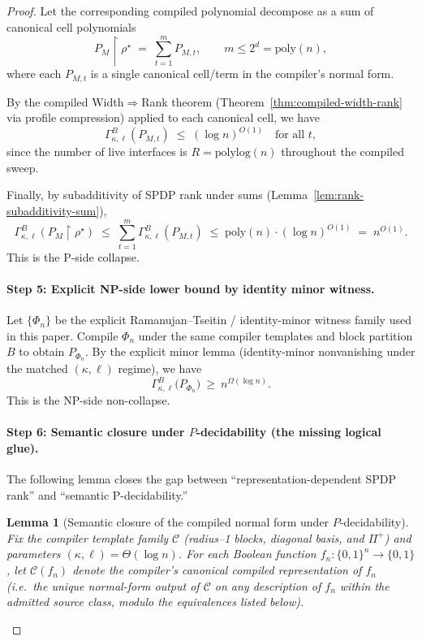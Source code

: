 \documentclass[12pt]{article}
\newcommand{\Comp}{\mathcal{C}}
\newtheorem{lemma}[theorem]{Lemma}
\theoremstyle{definition}
\theoremstyle{definition}
\theoremstyle{remark}
\theoremstyle{remark}
\begin{document}
\begin{proof}
Let the corresponding compiled polynomial decompose as a sum of canonical cell polynomials
\[
P_M\!\upharpoonright \rho^\star \;=\; \sum_{t=1}^{m} P_{M,t},
\qquad m \le 2^d = \mathrm{poly}(n),
\]
where each $P_{M,t}$ is a single canonical cell/term in the compiler's normal form.

By the compiled Width$\Rightarrow$Rank theorem (Theorem~\ref{thm:compiled-width-rank}
via profile compression) applied to each canonical cell, we have
\[
\Gamma^{B}_{\kappa,\ell}(P_{M,t}) \;\le\; (\log n)^{O(1)}
\quad\text{for all }t,
\]
since the number of live interfaces is $R=\mathrm{polylog}(n)$ throughout the compiled sweep.

Finally, by subadditivity of SPDP rank under sums (Lemma~\ref{lem:rank-subadditivity-sum}),
\[
\Gamma^{B}_{\kappa,\ell}(P_M\!\upharpoonright \rho^\star)
\;\le\; \sum_{t=1}^{m}\Gamma^{B}_{\kappa,\ell}(P_{M,t})
\;\le\; \mathrm{poly}(n)\cdot(\log n)^{O(1)}
\;=\; n^{O(1)}.
\]
This is the P-side collapse.

\paragraph{Step 5: Explicit NP-side lower bound by identity minor witness.}
Let $\{\Phi_n\}$ be the explicit Ramanujan--Tseitin / identity-minor witness family used in this paper.
Compile $\Phi_n$ under the same compiler templates and block partition $B$ to obtain $P_{\Phi_n}$.
By the explicit minor lemma (identity-minor nonvanishing under the matched $(\kappa,\ell)$ regime), we have
\[
\Gamma^B_{\kappa,\ell}\big(P_{\Phi_n}\big)\ \ge\ n^{\Omega(\log n)}.
\]
This is the NP-side non-collapse.

\paragraph{Step 6: Semantic closure under $P$-decidability (the missing logical glue).}
The following lemma closes the gap between ``representation-dependent SPDP rank'' and
``semantic P-decidability.''

\begin{lemma}[Semantic closure of the compiled normal form under $P$-decidability]
\label{lem:semantic-closure-compiled}
Fix the compiler template family $\Comp$ (radius--1 blocks, diagonal basis, and $\Pi^+$)
and parameters $(\kappa,\ell)=\Theta(\log n)$.  For each Boolean function
$f_n:\{0,1\}^n\to\{0,1\}$, let $\Comp(f_n)$ denote the compiler's \emph{canonical}
compiled representation of $f_n$ (i.e.\ the unique normal-form output of $\Comp$
on any description of $f_n$ within the admitted source class, modulo the equivalences
listed below).


\end{lemma}
\end{proof}
\end{document}
